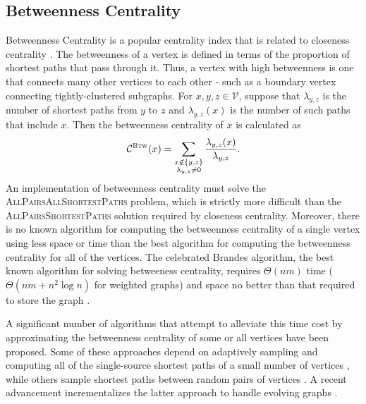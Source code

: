 \documentclass{report}
\newcommand{\algoname}[1]{\textnormal{\textsc{#1}}}
\begin{document}
\subsection{Betweenness Centrality} 
\label{sec:bc}

Betweenness Centrality is a popular centrality index that is related to closeness centrality \cite{freeman1977set}. 
The betweenness of a vertex is defined in terms of the proportion of shortest paths that pass through it.
Thus, a vertex with high betweenness is one that connects many other vertices to each other - such as a boundary vertex connecting tightly-clustered subgraphs.
For $x,y, z \in \mathcal{V}$, suppose that $\lambda_{y,z}$ is the number of shortest paths from $y$ to $z$ and $\lambda_{y,z}(x)$ is the number of such paths that include $x$. 
Then the betweenness centrality of $x$ is calculated as
%
\begin{equation} \label{eq:bc}
\mathcal{C}^{\algoname{Btw}}(x) = \sum\limits_{\substack{x \not\in \{y,z\} \\ \lambda_{y,z} \neq 0}} \frac{\lambda_{y,z}(x)}{\lambda_{y,z}}.
\end{equation}
%
An implementation of betweenness centrality must solve the \algoname{AllPairsAllShortestPaths} problem, which is strictly more difficult than the \algoname{AllPairsShortestPaths} solution required by closeness centrality.
Moreover, there is no known algorithm for computing the betweenness centrality of a single vertex using less space or time than the best algorithm for computing the betweenness centrality for all of the vertices. 
The celebrated Brandes algorithm, the best known algorithm for solving betweeness centrality, requires $\Theta(nm)$ time ($\Theta(nm + n^2\log n)$ for weighted graphs) and space no better than that required to store the graph  \cite{brandes2001faster}. 

A significant number of algorithms that attempt to alleviate this time cost by approximating the betweenness centrality of some or all vertices have been proposed. 
Some of these approaches depend on adaptively sampling and computing all of the single-source shortest paths of a small number of vertices \cite{bader2007approximating,brandes2007centrality}, while others sample shortest paths between random pairs of vertices \cite{riondato2016fast}. 
A recent advancement incrementalizes the latter approach to handle evolving graphs \cite{bergamini2014approximating}.
\end{document}
